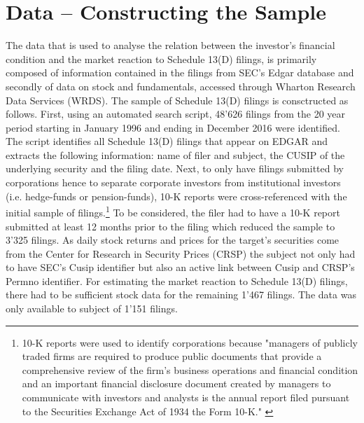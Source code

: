 \documentclass[12pt]{article}
\begin{document}
\section{Data -- Constructing the Sample}

The data that is used to analyse the relation between the investor's financial condition and the market reaction to Schedule 13(D) filings,  is primarily composed of information contained in the filings from SEC's Edgar database and secondly of data on stock and fundamentals,  accessed through Wharton Research Data Services (WRDS). The sample of Schedule 13(D) filings is consctructed as follows. First, using an automated search script, 48'626 filings from the 20 year period starting in January 1996 and ending in December 2016 were identified.  The script identifies all Schedule 13(D) filings that appear on EDGAR and extracts the following information: name of filer and subject, the CUSIP of the underlying security and the filing date. Next, to only have filings submitted by corporations hence to separate corporate investors from institutional investors (i.e. hedge-funds or pension-funds), 10-K reports were cross-referenced with the initial sample of filings.\footnote{10-K reports were used to identify corporations because "managers of publicly traded firms are required to produce public documents that provide a comprehensive review of the firm’s business operations and financial condition and an important financial disclosure document created by managers to communicate with investors and analysts is the annual report filed pursuant to the Securities Exchange Act of 1934 the Form 10-K." \citep[p. 1643]{Loughran2014}} To be considered, the filer had to have a 10-K report submitted at least 12 months prior to the filing which reduced the sample to 3'325 filings. As daily stock returns and prices for the target's securities come from the Center for Research in Security Prices (CRSP) the subject not only had to have SEC's Cusip identifier but also an active link between Cusip and CRSP's Permno identifier. For estimating the market reaction to Schedule 13(D) filings, there had to be sufficient stock data for the remaining 1'467 filings. The data was only available to subject of 1'151 filings. 
\end{document}
